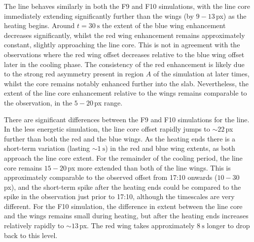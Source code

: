 
The \CaLine{} line behaves similarly in both the F9 and F10 simulations, with the line core immediately extending significantly further than the wings (by $9-13$\,{}px) as the heating begins.
Around $t=\SI{30}{\second}$ the extent of the blue wing enhancement decreases significantly, whilst the red wing enhancement remains approximately constant, slightly approaching the line core.
This is not in agreement with the observations where the red wing offset decreases relative to the blue wing offset later in the cooling phase.
The consistency of the red enhancement is likely due to the strong red asymmetry present in region $A$ of the simulation at later times, whilst the core remains notably enhanced further into the slab.
Nevertheless, the extent of the line core enhancement relative to the wings remains comparable to the observation, in the $5-20$\,{}px range.

There are significant differences between the F9 and F10 simulations for the \Ha{} line.
In the less energetic simulation, the line core offset rapidly jumps to $\sim22$\,{}px further than both the red and the blue wings.
As the heating ends there is a short-term variation (lasting $\sim\SI{1}{\second}$) in the red and blue wing extents, as both approach the line core extent.
For the remainder of the cooling period, the line core remains $15-20$\,{}px more extended than both of the line wings.
This is approximately comparable to the observed offset from 17:10 onwards ($10-30$\,{}px), and the short-term spike after the heating ends could be compared to the spike in the observation just prior to 17:10, although the timescales are very different.
For the F10 simulation, the difference in extent between the line core and the wings remains small during heating, but after the heating ends increases relatively rapidly to $\sim13$\,{}px.
The red wing takes approximately $\SI{8}{\second}$ longer to drop back to this level.

